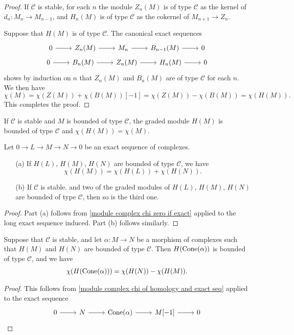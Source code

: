 \begin{proof}
If $\mathscr{C}$ is stable, for each $n$ the module $Z_n(M)$ is of type $\mathscr{C}$ as the kernel of $d_n:M_n\to M_{n-1}$, and $H_n(M)$ is of type $\mathscr{C}$ as the cokernel of $M_{n+1}\to Z_n$.\par
Suppose that $H(M)$ is of type $\mathscr{C}$. The canonical exact sequences
\[
\begin{gathered}
\begin{tikzcd}
0\ar[r]&Z_n(M)\ar[r]&M_n\ar[r]&B_{n-1}(M)\ar[r]&0
\end{tikzcd}\\
\begin{tikzcd}
0\ar[r]&B_n(M)\ar[r]&Z_n(M)\ar[r]&H_n(M)\ar[r]&0
\end{tikzcd}
\end{gathered}
\]
shows by induction on $n$ that $Z_n(M)$ and $B_n(M)$ are of type $\mathscr{C}$ for each $n$. We then have
\[\chi(M)=\chi(Z(M))+\chi(B(M))[-1]=\chi(Z(M))-\chi(B(M))=\chi(H(M)).\]
This completes the proof.
\end{proof}
\begin{corollary}
If $\mathscr{C}$ is stable and $M$ is bounded of type $\mathscr{C}$, the graded module $H(M)$ is bounded of type $\mathscr{C}$ and $\chi(H(M))=\chi(M)$.
\end{corollary}
\begin{proposition}\label{module complex chi of homology and exact seq}
Let $0\to L\to M\to N\to 0$ be an exact sequence of complexes.
\begin{itemize}
\item[(a)] If $H(L)$, $H(M)$, $H(N)$ are bounded of type $\mathscr{C}$, we have
\[\chi(H(M))=\chi(H(L))+\chi(H(N)).\] 
\item[(b)] If $\mathscr{C}$ is stable. and two of the graded modules of $H(L)$, $H(M)$, $H(N)$ are bounded of type $\mathscr{C}$, then so is the third one.
\end{itemize}
\end{proposition}
\begin{proof}
Part (a) follows from \cref{module complex chi zero if exact} applied to the long exact sequence induced. Part (b) follows similarly.  
\end{proof}
\begin{corollary}\label{module complex chi of homology of mapping cone prop}
Suppose that $\mathscr{C}$ is stable, and let $\alpha:M\to N$ be a morphism of complexes such that $H(M)$ and $H(N)$ are bounded of type $\mathscr{C}$. Then $H(\mathrm{Cone}(\alpha))$ is bounded of type $\mathscr{C}$, and we have
\[\chi(H(\mathrm{Cone}(\alpha)))=\chi(H(N))-\chi(H(M)).\]
\end{corollary}
\begin{proof}
This follows from \cref{module complex chi of homology and exact seq} applied to the exact sequence
\begin{equation*}
\begin{tikzcd}
0\ar[r]&N\ar[r]&\Cone(\alpha)\ar[r]&M[-1]\ar[r]&0
\end{tikzcd}\qedhere
\end{equation*}
\end{proof}
